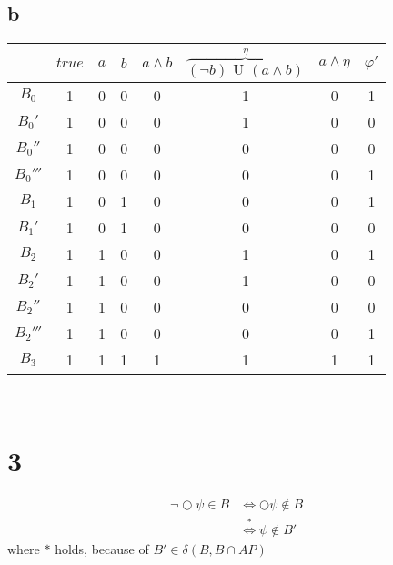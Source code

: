 \documentclass[11pt]{article}
\begin{document}
	\subsection{b}
	\begin{tabular}{c|ccccccc}
		& $true$ & $a$ & $b$ & $a \land b$ & $\overbrace{(\lnot b) \text{ U } (a \land b)}^\eta$ & $a\land \eta$ & $\varphi'$\\ \hline
		$B_0$ & 1 & 0 & 0 & 0 & 1 & 0 & 1\\
		$B_0'$ & 1 & 0 & 0 & 0 & 1 & 0 & 0\\
		$B_0''$ & 1 & 0 & 0 & 0 & 0 & 0 & 0\\
		$B_0'''$ & 1 & 0 & 0 & 0 & 0 & 0 & 1\\
		$B_1$ & 1 & 0 & 1 & 0 & 0 & 0 & 1\\
		$B_1'$ & 1 & 0 & 1 & 0 & 0 & 0 & 0\\
		$B_2$ & 1 & 1 & 0 & 0 & 1 & 0 & 1\\
		$B_2'$ & 1 & 1 & 0 & 0 & 1 & 0 & 0\\
		$B_2''$ & 1 & 1 & 0 & 0 & 0 & 0 & 0\\
		$B_2'''$ & 1 & 1 & 0 & 0 & 0 & 0 & 1\\
		$B_3$ & 1 & 1 & 1 & 1 & 1 & 1 & 1\\
	\end{tabular}\\
	
	\section{3}
	\begin{align*}
	\lnot\bigcirc\psi \in B &\Leftrightarrow \bigcirc\psi \notin B \\
	&\stackrel{*}{\Leftrightarrow} \psi \notin B'	
	\end{align*}
	where $*$ holds, because of $B'\in \delta(B,B\cap AP)$
	
	
	
	
	
\end{document}
